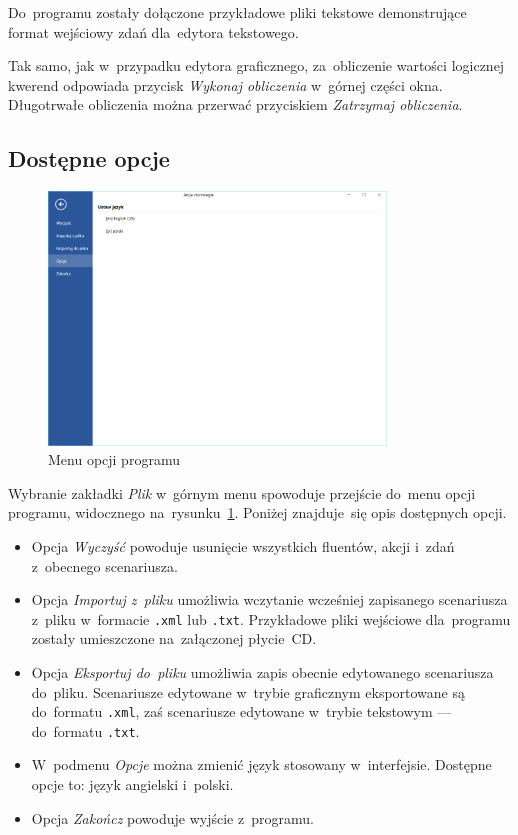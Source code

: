 \documentclass[11pt,a4paper]{article}
\begin{document}
Do~programu zostały dołączone przykładowe pliki tekstowe demonstrujące format wejściowy zdań dla~edytora tekstowego.

Tak samo, jak w~przypadku edytora graficznego, za~obliczenie wartości logicznej kwerend odpowiada przycisk \emph{Wykonaj obliczenia} w~górnej części okna.
Długotrwałe obliczenia można przerwać przyciskiem \emph{Zatrzymaj obliczenia}.

\subsection{Dostępne opcje}

\begin{figure}[H]
    \centering
    \includegraphics[width=0.8\textwidth]{res/img/options.png}
    \caption{Menu opcji programu}
    \label{fig:options}
\end{figure}

Wybranie zakładki \emph{Plik} w~górnym menu spowoduje przejście do~menu opcji programu, widocznego na~rysunku~\ref{fig:options}.
Poniżej znajduje~się opis dostępnych opcji.

\begin{itemize}
    \item Opcja \emph{Wyczyść} powoduje usunięcie wszystkich fluentów, akcji i~zdań z~obecnego scenariusza.
    \item Opcja \emph{Importuj z~pliku} umożliwia wczytanie wcześniej zapisanego scenariusza z~pliku w~formacie \verb+.xml+ lub \verb+.txt+.
    Przykładowe pliki wejściowe dla~programu zostały umieszczone na~załączonej płycie~CD.
    \item Opcja \emph{Eksportuj do~pliku} umożliwia zapis obecnie edytowanego scenariusza do~pliku.
    Scenariusze edytowane w~trybie graficznym eksportowane są do~formatu \verb+.xml+, zaś scenariusze edytowane w~trybie tekstowym --- do~formatu \verb+.txt+.
    \item W~podmenu \emph{Opcje} można zmienić język stosowany w~interfejsie.
    Dostępne opcje to: język angielski i~polski.
    \item Opcja \emph{Zakończ} powoduje wyjście z~programu.
\end{itemize}
\end{document}
